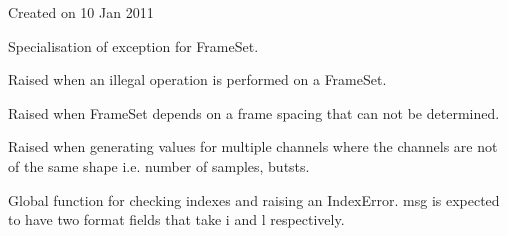 \documentclass[letterpaper,10pt,english]{sphinxmanual}
\begin{document}
Created on 10 Jan 2011

\begin{fulllineitems}
\label{\detokenize{ref/LIS/core/FrameSet:TotalDepth.LIS.core.FrameSet.ExceptionFrameSet}}
Specialisation of exception for FrameSet.

\end{fulllineitems}


\begin{fulllineitems}
\label{\detokenize{ref/LIS/core/FrameSet:TotalDepth.LIS.core.FrameSet.ExceptionFrameSetEmpty}}
Raised when an illegal operation is performed on a FrameSet.

\end{fulllineitems}


\begin{fulllineitems}
\label{\detokenize{ref/LIS/core/FrameSet:TotalDepth.LIS.core.FrameSet.ExceptionFrameSetNULLSpacing}}
Raised when FrameSet depends on a frame spacing that can not be determined.

\end{fulllineitems}


\begin{fulllineitems}
\label{\detokenize{ref/LIS/core/FrameSet:TotalDepth.LIS.core.FrameSet.ExceptionFrameSetMixedChannels}}
Raised when generating values for multiple channels where the channels are not of the same shape i.e. number of samples, butsts.

\end{fulllineitems}


\begin{fulllineitems}
\label{\detokenize{ref/LIS/core/FrameSet:TotalDepth.LIS.core.FrameSet.chkIdx}}
Global function for checking indexes and raising an IndexError.
msg is expected to have two format fields that take i and l respectively.

\end{fulllineitems}
\end{document}
